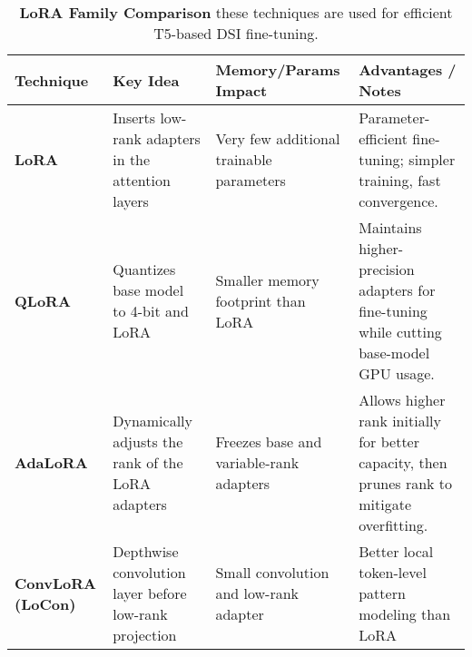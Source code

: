 \begin{table*}[h]
\centering
\begin{tabular}{p{2.1cm}p{2.8cm}p{3.0cm}p{5.5cm}}
\toprule
\textbf{Technique} & \textbf{Key Idea} & \textbf{Memory/Params Impact} & \textbf{Advantages / Notes} \\
\midrule

\textbf{LoRA} 
& Inserts low-rank adapters in the attention layers
& Very few additional trainable parameters 
& Parameter-efficient fine-tuning; simpler training, fast convergence. \\

\textbf{QLoRA} 
& Quantizes base model to 4-bit and LoRA
& Smaller memory footprint than LoRA 
& Maintains higher-precision adapters for fine-tuning while cutting base-model GPU usage. \\

\textbf{AdaLoRA} 
& Dynamically adjusts the rank of the LoRA adapters 
& Freezes base  and variable-rank adapters 
& Allows higher rank initially for better capacity, then prunes rank to mitigate overfitting.  \\

\textbf{ConvLoRA (LoCon)} 
& Depthwise convolution layer before low-rank projection 
& Small convolution and low-rank adapter 
& Better local token-level pattern modeling than LoRA \\
\bottomrule
\end{tabular}
\caption{\textbf{LoRA Family Comparison} these techniques are used for efficient T5-based DSI fine-tuning.}
\label{tab:comparison}
\end{table*}


